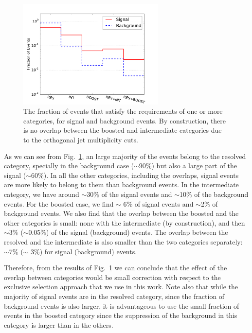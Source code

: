 \begin{figure}[t]
\begin{center}
\includegraphics[width=0.65\textwidth]{plots/overlap_categories_C1.pdf}
\caption{\small The fraction of events that satisfy the requirements
  of one or more categories, for signal and background events.
  By construction, there is no overlap between the boosted
  and intermediate categories due to the
   orthogonal jet multiplicity cuts.
}
\label{fig:categorisationHisto}
\end{center}
\end{figure}

As we can see from Fig.~\ref{fig:categorisationHisto}, an large majority of the events
belong to the resolved category, specially in the background case ($\sim 90\%$) but
also a large part of the signal ($\sim 60\%$).
%
In all the other categories, including
the overlaps, signal events are more likely to belong to them than
background events.
%
In the intermediate category, we have around $\sim$30\% of the signal
events and $\sim$10\% of the background events.
%
For the boosted case, we find $\sim$ 6\% of signal events and
$\sim$2\% of background events.
%
We also find that the overlap between the boosted and the other categories
is small: none with the intermediate (by construction), and then $\sim$3\%
($\sim$0.05\%) of the signal (background) events.
%
The overlap between the resolved and the intermediate is also smaller
than the two categories separately: $\sim$7\%
($\sim$ 3\%) for signal (background) events.

Therefore, from the results of Fig.~\ref{fig:categorisationHisto}
we can conclude that the effect of the overlap between categories would
be small correction with respect to the exclusive selection approach
that we use in this work.
%
Note also that while the majority of signal events are in the resolved
category, since the fraction of background events is also larger,
it is advantageous to use the small fraction of events in the boosted category
since the suppression of the background in this category is larger
than in the others.
